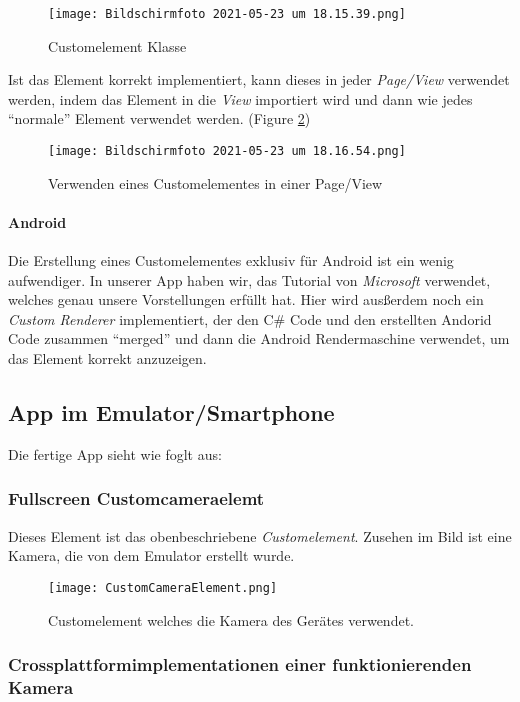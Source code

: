 \begin{figure}[h]
    \centering
    \texttt{[image: Bildschirmfoto 2021-05-23 um 18.15.39.png]}
    \caption{Customelement Klasse}
    \label{fig:CustomelementCS}
\end{figure} 

Ist das Element korrekt implementiert, kann dieses in jeder \textit{Page/View} verwendet werden, indem das Element
in die \textit{View} importiert wird und dann wie jedes ``normale'' Element verwendet werden. (Figure \ref{fig:UsingCustomElement})

\begin{figure}[h]
    \centering
    \texttt{[image: Bildschirmfoto 2021-05-23 um 18.16.54.png]}
    \caption{Verwenden eines Customelementes in einer Page/View}
    \label{fig:UsingCustomElement}
\end{figure}
\paragraph{Android} 
 Die Erstellung eines Customelementes exklusiv für Android ist ein wenig aufwendiger. In unserer App haben wir, das Tutorial von 
\textit{Microsoft} verwendet, welches genau unsere Vorstellungen erfüllt hat. Hier wird ausßerdem noch ein \textit{Custom Renderer} implementiert, der
den C\# Code und den erstellten Andorid Code zusammen ``merged'' und dann die Android Rendermaschine verwendet, um das Element korrekt anzuzeigen.

\subsection{App im Emulator/Smartphone}
Die fertige App sieht wie foglt aus:

\newpage
\subsubsection{Fullscreen Customcameraelemt}
Dieses Element ist das obenbeschriebene \textit{Customelement}.
Zusehen im Bild ist eine Kamera, die von dem Emulator erstellt wurde.
\begin{figure}[h]
    \centering
    \texttt{[image: CustomCameraElement.png]}
    \caption{Customelement welches die Kamera des Gerätes verwendet.}
\end{figure}
\subsubsection{Crossplattformimplementationen einer funktionierenden Kamera}
